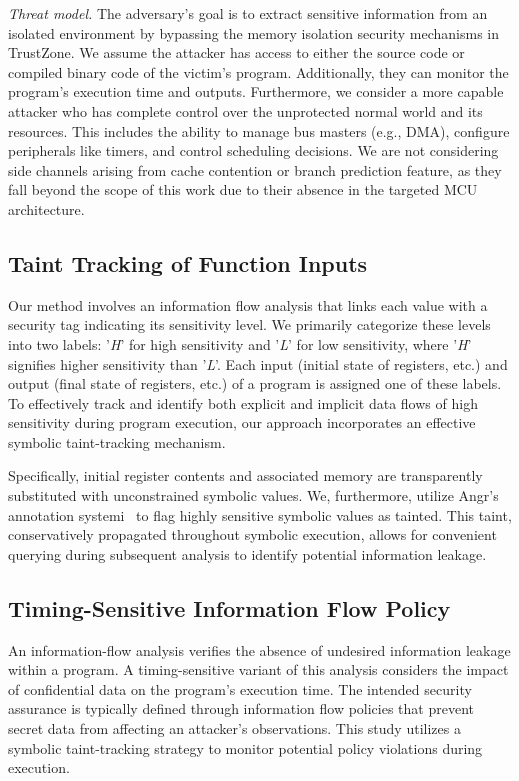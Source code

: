 \textit{Threat model.} The adversary’s goal is to extract sensitive information from an isolated environment by bypassing the memory isolation security mechanisms in TrustZone. We assume the attacker has access to either the source code or compiled binary code of the victim's program. Additionally, they can monitor the program's execution time and outputs. Furthermore, we consider a more capable attacker who has complete control over the unprotected normal world and its resources. This includes the ability to manage bus masters (e.g., DMA), configure peripherals like timers, and control scheduling decisions. We are not considering side channels arising from cache contention or branch prediction feature, as they fall beyond the scope of this work due to their absence in the targeted MCU architecture.

\subsection{Taint Tracking of Function Inputs}

Our method involves an information flow analysis that links each value with a security tag indicating its sensitivity level. We primarily categorize these levels into two labels: '\textit{H}' for high sensitivity and '\textit{L}' for low sensitivity, where '\textit{H}' signifies higher sensitivity than '\textit{L}'. Each input (initial state of registers, etc.) and output (final state of registers, etc.) of a program is assigned one of these labels. To effectively track and identify both explicit and implicit data flows of high sensitivity during program execution, our approach incorporates an effective symbolic taint-tracking mechanism.

Specifically, initial register contents and associated memory are
transparently substituted with unconstrained symbolic values. We,
furthermore, utilize Angr’s annotation systemi~\cite{angr} to flag highly sensitive symbolic values as tainted. This taint, conservatively propagated throughout symbolic execution, allows for convenient querying during subsequent analysis to identify potential information leakage. 

\subsection{Timing-Sensitive Information Flow Policy}

An information-flow analysis verifies the absence of undesired information leakage within a program. A timing-sensitive variant of this analysis considers the impact of confidential data on the program's execution time. The intended security assurance is typically defined through information flow policies that prevent secret data from affecting an attacker's observations. This study utilizes a symbolic taint-tracking strategy to monitor potential policy violations during execution.


